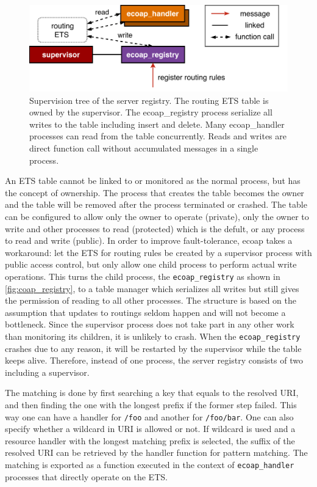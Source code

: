 \begin{figure}[!htbp]
\centering
\includegraphics[scale = 0.7]{coap_registry}
\caption[Supervision tree of the server registry]{Supervision tree of the server registry. The routing ETS table is owned by the supervisor. The ecoap\_registry process serialize all writes to the table including insert and delete. Many ecoap\_handler processes can read from the table concurrently. Reads and writes are direct function call without accumulated messages in a single process.}
\label{fig:coap_registry}
\end{figure}
 
An ETS table cannot be linked to or monitored as the normal process, but has the concept of ownership. The process that creates the table becomes the owner and the table will be removed after the process terminated or crashed. The table can be configured to allow only the owner to operate (private), only the owner to write and other processes to read (protected) which is the defult, or any process to read and write (public). In order to improve fault-tolerance, ecoap takes a workaround: let the ETS for routing rules be created by a supervisor process with public access control, but only allow one child process to perform actual write operations. This turns the child process, the \verb|ecoap_registry| as shown in \autoref{fig:coap_registry}, to a table manager which serializes all writes but still gives the permission of reading to all other processes. The structure is based on the assumption that updates to routings seldom happen and will not become a bottleneck. Since the supervisor process does not take part in any other work than monitoring its children, it is unlikely to crash. When the \verb|ecoap_registry| crashes due to any reason, it will be restarted by the supervisor while the table keeps alive. Therefore, instead of one process, the server registry consists of two including a supervisor. 

The matching is done by first searching a key that equals to the resolved URI, and then finding the one with the longest prefix if the former step failed. This way one can have a handler for \verb|/foo| and another for \verb|/foo/bar|. One can also specify whether a wildcard in URI is allowed or not. If wildcard is used and a resource handler with the longest matching prefix is selected, the suffix of the resolved URI can be retrieved by the handler function for pattern matching. The matching is exported as a function executed in the context of \verb|ecoap_handler| processes that directly operate on the ETS. 

